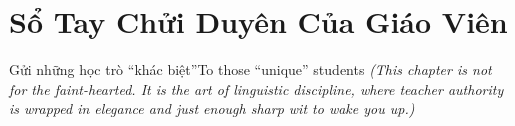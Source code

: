 \chapter{Sổ Tay Chửi Duyên Của Giáo Viên}

\begin{truyen}{Gửi những học trò ``khác biệt''}{To those ``unique'' students}
\textit{\color{v3teal}(This chapter is not for the faint-hearted. It is the art of linguistic discipline, where teacher authority is wrapped in elegance and just enough sharp wit to wake you up.)}
\end{truyen}


